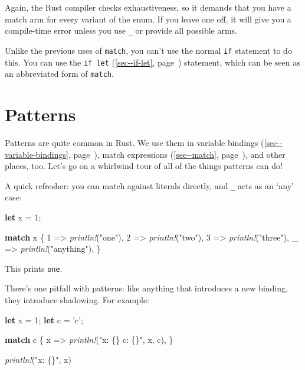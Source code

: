 \documentclass[a4paper,]{book}
\renewcommand*{\hypertarget}[3][\ar]{%
  \def\ar{#2}%
  \label{#1}%
  #3}
\renewcommand*{\hyperlink}[2]{%
 #2 (\autoref{#1}, page~\pageref{#1})}
\newenvironment{Shaded}{\begin{snugshade}}{\end{snugshade}}
\newcommand{\KeywordTok}[1]{\textcolor[rgb]{0.13,0.29,0.53}{\textbf{{#1}}}}
\newcommand{\DecValTok}[1]{\textcolor[rgb]{0.00,0.00,0.81}{{#1}}}
\newcommand{\CharTok}[1]{\textcolor[rgb]{0.31,0.60,0.02}{{#1}}}
\newcommand{\StringTok}[1]{\textcolor[rgb]{0.31,0.60,0.02}{{#1}}}
\newcommand{\PreprocessorTok}[1]{\textcolor[rgb]{0.56,0.35,0.01}{\textit{{#1}}}}
\newcommand{\NormalTok}[1]{{#1}}
\begin{document}
Again, the Rust compiler checks exhaustiveness, so it demands that you
have a match arm for every variant of the enum. If you leave one off, it
will give you a compile-time error unless you use \texttt{\_} or provide
all possible arms.

Unlike the previous uses of \texttt{match}, you can't use the normal
\texttt{if} statement to do this. You can use the
\protect\hyperlink{sec--if-let}{\texttt{if\ let}} statement, which can
be seen as an abbreviated form of \texttt{match}.

\hypertarget{sec--patterns}{\section{Patterns}\label{sec--patterns}}

Patterns are quite common in Rust. We use them in
\protect\hyperlink{sec--variable-bindings}{variable bindings},
\protect\hyperlink{sec--match}{match expressions}, and other places,
too. Let's go on a whirlwind tour of all of the things patterns can do!

A quick refresher: you can match against literals directly, and
\texttt{\_} acts as an `any' case:

\begin{Shaded}
\begin{Highlighting}[]
\KeywordTok{let} \NormalTok{x = }\DecValTok{1}\NormalTok{;}

\KeywordTok{match} \NormalTok{x \{}
    \DecValTok{1} \NormalTok{=> }\PreprocessorTok{println!}\NormalTok{(}\StringTok{"one"}\NormalTok{),}
    \DecValTok{2} \NormalTok{=> }\PreprocessorTok{println!}\NormalTok{(}\StringTok{"two"}\NormalTok{),}
    \DecValTok{3} \NormalTok{=> }\PreprocessorTok{println!}\NormalTok{(}\StringTok{"three"}\NormalTok{),}
    \NormalTok{_ => }\PreprocessorTok{println!}\NormalTok{(}\StringTok{"anything"}\NormalTok{),}
\NormalTok{\}}
\end{Highlighting}
\end{Shaded}

This prints \texttt{one}.

There's one pitfall with patterns: like anything that introduces a new
binding, they introduce shadowing. For example:

\begin{Shaded}
\begin{Highlighting}[]
\KeywordTok{let} \NormalTok{x = }\DecValTok{1}\NormalTok{;}
\KeywordTok{let} \NormalTok{c = }\CharTok{'c'}\NormalTok{;}

\KeywordTok{match} \NormalTok{c \{}
    \NormalTok{x => }\PreprocessorTok{println!}\NormalTok{(}\StringTok{"x: \{\} c: \{\}"}\NormalTok{, x, c),}
\NormalTok{\}}

\PreprocessorTok{println!}\NormalTok{(}\StringTok{"x: \{\}"}\NormalTok{, x)}
\end{Highlighting}
\end{Shaded}
\end{document}
